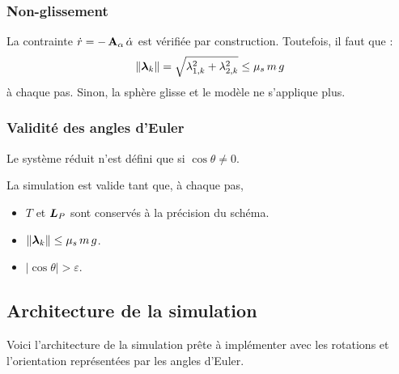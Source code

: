 \subsubsection{Non-glissement}

La contrainte $\dot r = -\,\mathbf{A}_\alpha\,\dot\alpha$ est vérifiée par
construction. Toutefois, il faut que : 
\[
    \|\bm{\lambda}_k\| = \sqrt{\lambda_{1,k}^2 + \lambda_{2,k}^2}
    \leq \mu_s\,m\,g
\]
à chaque pas. Sinon, la sphère glisse et le modèle ne s'applique plus.

\subsubsection{Validité des angles d'Euler}

Le système réduit n'est défini que si $\cos\theta \neq 0$.
\begin{hypotheses}
    La simulation est valide tant que, à chaque pas,
    \begin{itemize}
        \item $T$ et $\bm{L}_P$ sont conservés à la précision du
        schéma.
        \item $\|\bm{\lambda}_k\| \leq \mu_s\,m\,g$.
        \item $|\cos\theta| > \varepsilon$.
    \end{itemize}
\end{hypotheses}
\subsection{Architecture de la simulation}

Voici l'architecture de la simulation prête à implémenter avec les rotations et l'orientation représentées par les angles d'Euler.

